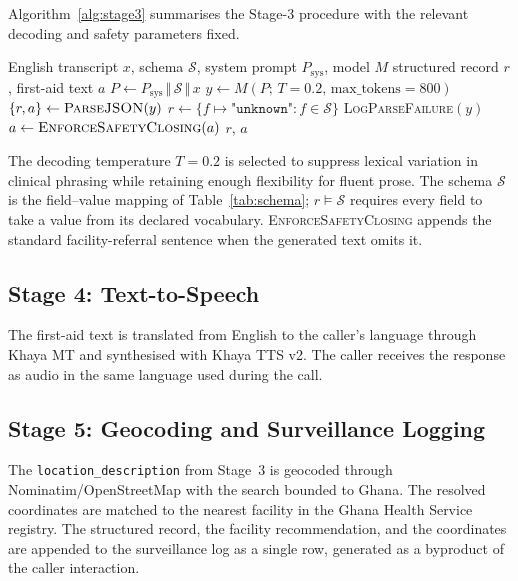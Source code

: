 \documentclass[conference]{IEEEtran}
\begin{document}
Algorithm~\ref{alg:stage3} summarises the Stage-3 procedure with
the relevant decoding and safety parameters fixed.

\begin{algorithm}[!t]
\caption{Stage-3 extraction and first-aid generation.}
\label{alg:stage3}
\begin{algorithmic}[1]
\Require English transcript $x$, schema $\mathcal{S}$, system
prompt $P_{\mathrm{sys}}$, model $M$
\Ensure structured record $r$, first-aid text $a$
\State $P \gets P_{\mathrm{sys}} \,\Vert\, \mathcal{S} \,\Vert\, x$
\State $y \gets M(P;\, T = 0.2,\, \text{max\_tokens} = 800)$
\State $\{r, a\} \gets \textsc{ParseJSON}(y)$
  \State $r \gets \{f \mapsto \texttt{"unknown"} :
                    f \in \mathcal{S}\}$
  \State \textsc{LogParseFailure}$(y)$
\EndIf
\State $a \gets \textsc{EnforceSafetyClosing}(a)$
\State \Return $r$, $a$
\end{algorithmic}
\end{algorithm}

The decoding temperature $T = 0.2$ is selected to suppress lexical
variation in clinical phrasing while retaining enough flexibility for
fluent prose. The schema $\mathcal{S}$ is the field--value mapping
of Table~\ref{tab:schema}; $r \models \mathcal{S}$ requires every
field to take a value from its declared vocabulary.
\textsc{EnforceSafetyClosing} appends the standard facility-referral
sentence when the generated text omits it.

\subsection{Stage 4: Text-to-Speech}
The first-aid text is translated from English to the caller's
language through Khaya MT and synthesised with Khaya TTS v2. The
caller receives the response as audio in the same language used
during the call.

\subsection{Stage 5: Geocoding and Surveillance Logging}
The \texttt{location\_description} from Stage~3 is geocoded through
Nominatim/OpenStreetMap with the search bounded to Ghana. The
resolved coordinates are matched to the nearest facility in the
Ghana Health Service registry. The structured record, the facility
recommendation, and the coordinates are appended to the surveillance
log as a single row, generated as a byproduct of the caller
interaction.
\end{document}
